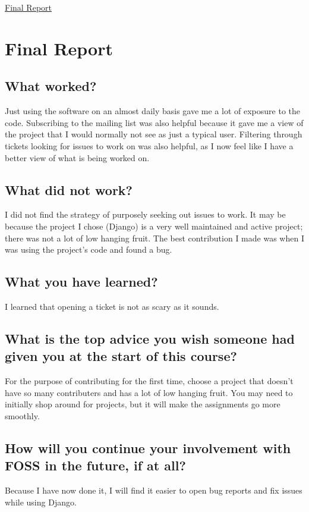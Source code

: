 \documentclass[12pt]{article}
\def\title{Final Report}
\begin{document}
\begin{center}
\underline{
\large{\title}
}
\end{center}
\singlespacing

\section{Final Report}
\subsection{What worked?}
Just using the software on an almost daily basis gave me a lot of exposure to
the code. Subscribing to the mailing list was also helpful because it gave me a
view of the project that I would normally not see as just a typical user.
Filtering through tickets looking for issues to work on was also helpful, as I
now feel like I have a better view of what is being worked on.
\subsection{What did not work?}
I did not find the strategy of purposely seeking out issues to work. It may be
because the project I chose (Django) is a very well maintained and active
project; there was not a lot of low hanging fruit. The best contribution I made
was when I was using the project's code and found a bug.
\subsection{What you have learned?}
I learned that opening a ticket is not as scary as it sounds.
\subsection{What is the top advice you wish someone had given you at the start of this course?}
For the purpose of contributing for the first time, choose a project that
doesn't have so many contributers and has a lot of low hanging fruit. You may
need to initially shop around for projects, but it will make the assignments
go more smoothly.
\subsection{How will you continue your involvement with FOSS in the future, if at all?}
Because I have now done it, I will find it easier to open bug reports and
fix issues while using Django.
\end{document}
